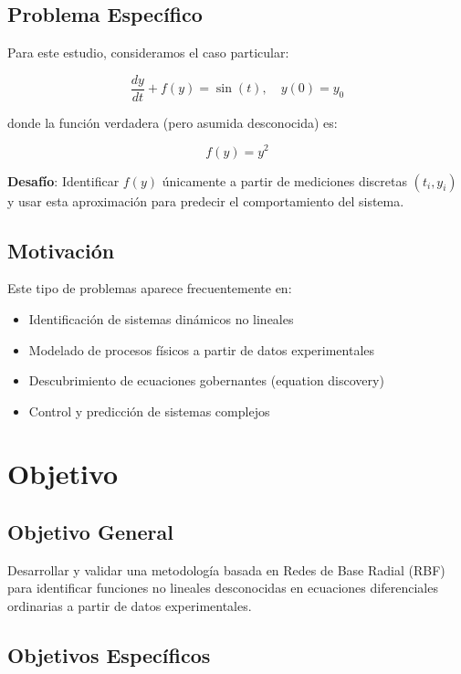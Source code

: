 \documentclass[11pt,a4paper]{article}
\begin{document}
\subsection{Problema Específico}

Para este estudio, consideramos el caso particular:

\begin{equation}
\frac{dy}{dt} + f(y) = \sin(t), \quad y(0) = y_0
\label{eq:ode_specific}
\end{equation}

donde la función verdadera (pero asumida desconocida) es:

\begin{equation}
f(y) = y^2
\label{eq:f_true}
\end{equation}

\textbf{Desafío}: Identificar $f(y)$ únicamente a partir de mediciones discretas $(t_i, y_i)$ y usar esta aproximación para predecir el comportamiento del sistema.

\subsection{Motivación}

Este tipo de problemas aparece frecuentemente en:
\begin{itemize}
    \item Identificación de sistemas dinámicos no lineales
    \item Modelado de procesos físicos a partir de datos experimentales
    \item Descubrimiento de ecuaciones gobernantes (equation discovery)
    \item Control y predicción de sistemas complejos
\end{itemize}

\section{Objetivo}

\subsection{Objetivo General}

Desarrollar y validar una metodología basada en Redes de Base Radial (RBF) para identificar funciones no lineales desconocidas en ecuaciones diferenciales ordinarias a partir de datos experimentales.

\subsection{Objetivos Específicos}
\end{document}
